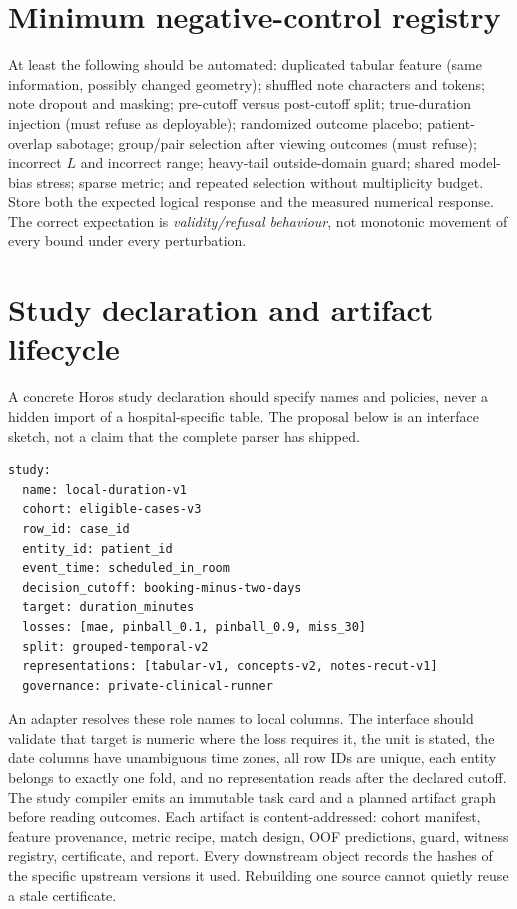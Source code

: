 \documentclass[11pt]{article}
\begin{document}
\section{Minimum negative-control registry}
At least the following should be automated: duplicated tabular feature (same information, possibly changed geometry); shuffled note characters and tokens; note dropout and masking; pre-cutoff versus post-cutoff split; true-duration injection (must refuse as deployable); randomized outcome placebo; patient-overlap sabotage; group/pair selection after viewing outcomes (must refuse); incorrect $L$ and incorrect range; heavy-tail outside-domain guard; shared model-bias stress; sparse metric; and repeated selection without multiplicity budget. Store both the expected logical response and the measured numerical response. The correct expectation is \emph{validity/refusal behaviour}, not monotonic movement of every bound under every perturbation.

\section{Study declaration and artifact lifecycle}
A concrete Horos study declaration should specify names and policies, never a hidden import of a hospital-specific table. The proposal below is an interface sketch, not a claim that the complete parser has shipped.
\begin{verbatim}
study:
  name: local-duration-v1
  cohort: eligible-cases-v3
  row_id: case_id
  entity_id: patient_id
  event_time: scheduled_in_room
  decision_cutoff: booking-minus-two-days
  target: duration_minutes
  losses: [mae, pinball_0.1, pinball_0.9, miss_30]
  split: grouped-temporal-v2
  representations: [tabular-v1, concepts-v2, notes-recut-v1]
  governance: private-clinical-runner
\end{verbatim}
An adapter resolves these role names to local columns. The interface should validate that target is numeric where the loss requires it, the unit is stated, the date columns have unambiguous time zones, all row IDs are unique, each entity belongs to exactly one fold, and no representation reads after the declared cutoff. The study compiler emits an immutable task card and a planned artifact graph before reading outcomes. Each artifact is content-addressed: cohort manifest, feature provenance, metric recipe, match design, OOF predictions, guard, witness registry, certificate, and report. Every downstream object records the hashes of the specific upstream versions it used. Rebuilding one source cannot quietly reuse a stale certificate.
\end{document}
